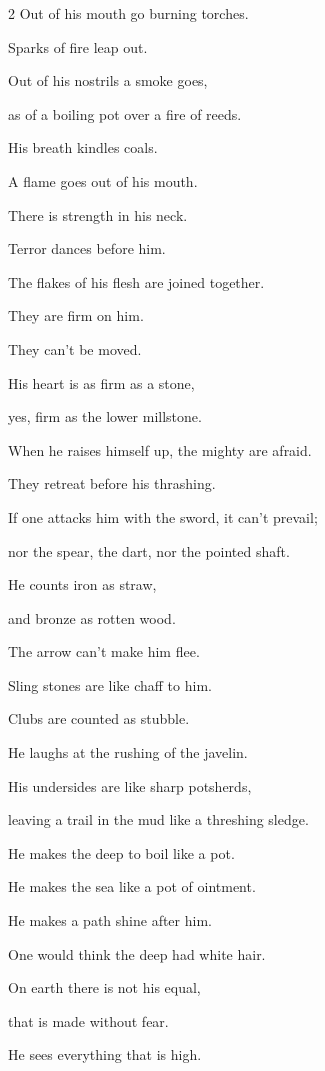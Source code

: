 \begin{multicols}{2}
	\myverse{}Out of his mouth go burning torches.
	
	Sparks of fire leap out.
	
	\myverse{}Out of his nostrils a smoke goes,
	
	as of a boiling pot over a fire of reeds.
	
	\myverse{}His breath kindles coals.
	
	A flame goes out of his mouth.
	
	\myverse{}There is strength in his neck.
	
	Terror dances before him.
	
	\myverse{}The flakes of his flesh are joined together.
	
	They are firm on him.
	
	They can’t be moved.
	
	\myverse{}His heart is as firm as a stone,
	
	yes, firm as the lower millstone.
	
	\myverse{}When he raises himself up, the mighty are afraid.
	
	They retreat before his thrashing.
	
	\myverse{}If one attacks him with the sword, it can’t prevail;
	
	nor the spear, the dart, nor the pointed shaft.
	
	\myverse{}He counts iron as straw,
	
	and bronze as rotten wood.
	
	\myverse{}The arrow can’t make him flee.
	
	Sling stones are like chaff to him.
	
	\myverse{}Clubs are counted as stubble.
	
	He laughs at the rushing of the javelin.
	
	\myverse{}His undersides are like sharp potsherds,
	
	leaving a trail in the mud like a threshing sledge.
	
	\myverse{}He makes the deep to boil like a pot.
	
	He makes the sea like a pot of ointment.
	
	\myverse{}He makes a path shine after him.
	
	One would think the deep had white hair.
	
	\myverse{}On earth there is not his equal,
	
	that is made without fear.
	
	\myverse{}He sees everything that is high.
	

\end{multicols}
